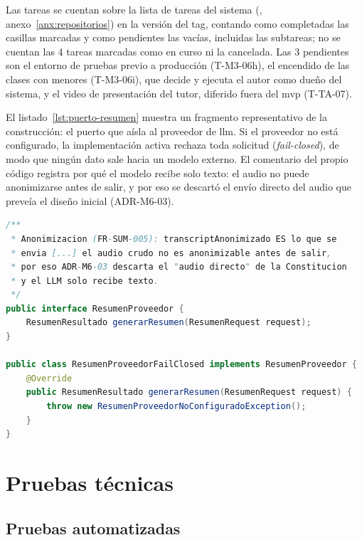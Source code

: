 Las tareas se cuentan sobre la lista de tareas del sistema
(, anexo~\ref{anx:repositorios})
en la versión del tag, contando como completadas las casillas marcadas y
como pendientes las vacías, incluidas las subtareas; no se cuentan las 4
tareas marcadas como en curso ni la cancelada. Las 3 pendientes son el
entorno de pruebas previo a producción (T-M3-06h), el encendido de las
clases con menores (T-M3-06i), que decide y ejecuta el autor como dueño
del sistema, y el video de presentación del tutor, diferido fuera del
\gls{mvp} (T-TA-07).

El listado~\ref{lst:puerto-resumen} muestra un fragmento representativo
de la construcción: el puerto que aísla al proveedor de \gls{llm}. Si el
proveedor no está configurado, la implementación activa rechaza toda
solicitud (\emph{fail-closed}), de modo que ningún dato sale hacia un
modelo externo. El comentario del propio código registra por qué el
modelo recibe solo texto: el audio no puede anonimizarse antes de salir,
y por eso se descartó el envío directo del audio que preveía el diseño
inicial (ADR-M6-03).

\begin{lstlisting}[language=Java, caption={Puerto del proveedor de \gls{llm} y su implementación \emph{fail-closed} (extracto)}, label={lst:puerto-resumen}]
/**
 * Anonimizacion (FR-SUM-005): transcriptAnonimizado ES lo que se
 * envia [...] el audio crudo no es anonimizable antes de salir,
 * por eso ADR-M6-03 descarta el "audio directo" de la Constitucion
 * y el LLM solo recibe texto.
 */
public interface ResumenProveedor {
    ResumenResultado generarResumen(ResumenRequest request);
}

public class ResumenProveedorFailClosed implements ResumenProveedor {
    @Override
    public ResumenResultado generarResumen(ResumenRequest request) {
        throw new ResumenProveedorNoConfiguradoException();
    }
}
\end{lstlisting}

\section{Pruebas técnicas}\label{sec:pruebas}

\subsection{Pruebas automatizadas}

